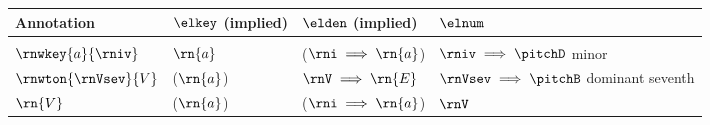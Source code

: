 \begin{tabular}{l|lll}
Annotation & $\elkey$ (implied)       & $\elden$ (implied)       & $\elnum$ \\
\hline \\
$\rnwkey{a}{\rniv}$         & $\rn{a}$              & ($\rni \implies \rn{a}$)       & $\rniv  \implies \pitchD$ minor      \\
$\rnwton{\rnVsev}{V}$       & ($\rn{a}$)            & $\rnV \implies \rn{E}$         & $\rnVsev \implies \pitchB$ dominant seventh \\
$\rn{V}$                    & ($\rn{a}$)            & ($\rni \implies \rn{a}$)       & $\rnV$    
\end{tabular}
